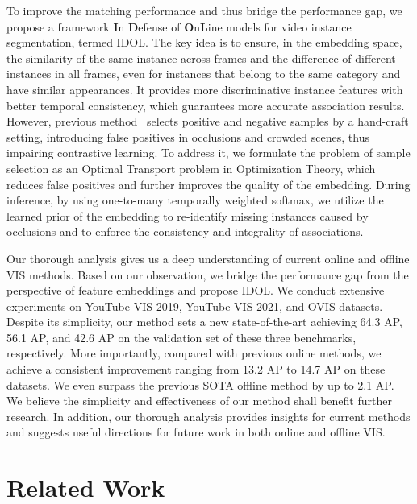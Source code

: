 \documentclass[runningheads]{llncs}
\begin{document}
To improve the matching performance and thus bridge the performance gap, we propose a framework \textbf{I}n \textbf{D}efense of \textbf{O}n\textbf{L}ine models for video instance segmentation, termed IDOL. The key idea is to ensure, in the embedding space, the similarity of the same instance across frames and the difference of different instances in all frames, even for instances that belong to the same category and have similar appearances. It provides more discriminative instance features with better temporal consistency, which guarantees more accurate association results.
However, previous method~\cite{QDTrack} selects positive and negative samples by a hand-craft setting, introducing false positives in occlusions and crowded scenes, thus impairing contrastive learning. To address it, we formulate the problem of sample selection as an Optimal Transport problem in Optimization Theory, which reduces false positives and further improves the quality of the embedding.
During inference, by using one-to-many temporally weighted softmax, we utilize the learned prior of the embedding to re-identify missing instances caused by occlusions and to enforce the consistency and integrality of associations. 

Our thorough analysis gives us a deep understanding of current online and offline VIS methods. Based on our observation, we bridge the performance gap from the perspective of feature embeddings and propose IDOL. We conduct extensive experiments on YouTube-VIS 2019, YouTube-VIS 2021, and OVIS datasets. Despite its simplicity, our method sets a new state-of-the-art achieving 64.3 AP, 56.1 AP, and 42.6 AP on the validation set of these three benchmarks, respectively. More importantly, compared with previous online methods, we achieve a consistent improvement ranging from 13.2 AP to 14.7 AP on these datasets. We even surpass the previous SOTA offline method by up to 2.1 AP. We believe the simplicity and effectiveness of our method shall benefit further research. In addition, our thorough analysis provides insights for current methods and suggests useful directions for future work in both online and offline VIS.

\section{Related Work}
\end{document}
